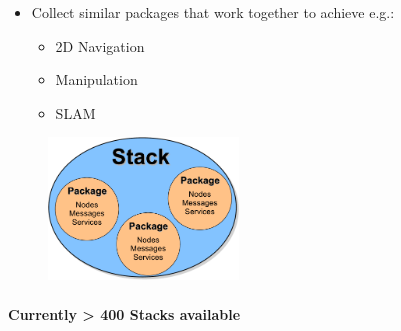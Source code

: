 \lyxframeend{}


\lyxframeend{}
\begin{itemize}
\item Collect similar packages that work together to achieve e.g.:

\begin{itemize}
\item 2D Navigation
\item Manipulation
\item SLAM
\end{itemize}
\end{itemize}
\noindent \begin{center}
\begin{figure}[H]
\noindent \centering{}\includegraphics[width=0.45\textwidth]{images/ROSStack}
\end{figure}

\par\end{center}


\lyxframeend{}


\lyxframeend{}


\framesubtitle{Currently > 400 Stacks available}

